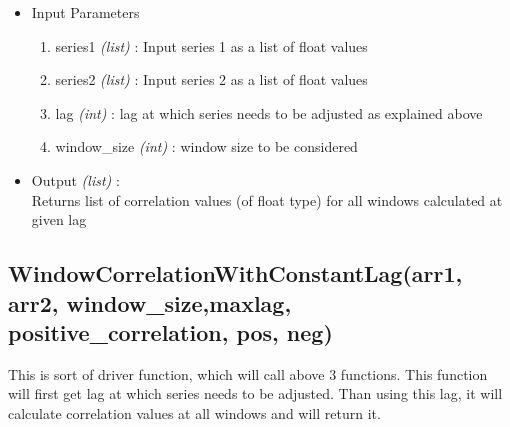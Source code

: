 \begin{itemize}
 \item Input Parameters
 
 \begin{enumerate}
  \item series1 \textit{(list)} : Input series 1 as a list of float values
  \item series2 \textit{(list)} : Input series 2 as a list of float values
  \item lag \textit{(int)} : lag at which series needs to be adjusted as 
explained above
  \item window\_size \textit{(int)} : window size to be considered
 \end{enumerate}

 \item Output \textit{(list)} : \\
  Returns list of correlation values (of float type) for all windows calculated 
at given lag \\
 
\end{itemize}


\subsection{WindowCorrelationWithConstantLag(arr1, arr2, window\_size,maxlag, 
positive\_correlation, pos, neg)}

This is sort of driver function, which will call above 3 functions. This 
function will first get lag at which series needs to be adjusted. Than using 
this lag, it will calculate correlation values at all windows and will return 
it.

